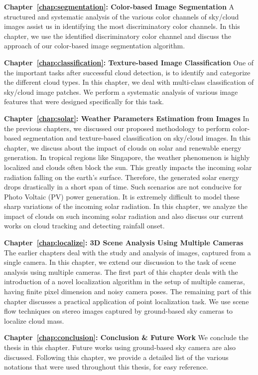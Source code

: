 \textbf{Chapter~\ref{chap:segmentation}: Color-based Image Segmentation} \tab A structured and systematic analysis of the various color channels of sky/cloud images assist us in identifying the most discriminatory color channels. In this chapter, we use the identified discriminatory color channel and discuss the approach of our color-based image segmentation algorithm. 



\textbf{Chapter~\ref{chap:classification}: Texture-based Image Classification} \tab One of the important tasks after successful cloud detection, is to identify and categorize the different cloud types. In this chapter, we deal with multi-class classification of sky/cloud image patches. We perform a systematic analysis of various image features that were designed specifically for this task. 


\textbf{Chapter~\ref{chap:solar}: Weather Parameters Estimation from Images} \tab In the previous chapters, we discussed our proposed methodology to perform color-based segmentation and texture-based classification on sky/cloud images. In this chapter, we discuss about the impact of clouds on solar and renewable energy generation. In tropical regions like Singapore, the weather phenomenon is highly localized and clouds often block the sun. This greatly impacts the incoming solar radiation falling on the earth's surface. Therefore, the generated solar energy drops drastically in a short span of time. Such scenarios are not conducive for Photo Voltaic (PV) power generation. It is extremely difficult to model these sharp variations of the incoming solar radiation. In this chapter, we analyze the impact of clouds on such incoming solar radiation and also discuss our current works on cloud tracking and detecting rainfall onset.


\textbf{Chapter~\ref{chap:localize}: 3D Scene Analysis Using Multiple Cameras} The earlier chapters deal with the study and analysis of images, captured from a single camera. In this chapter, we extend our discussion to the task of scene analysis using multiple cameras. The first part of this chapter deals with the introduction of a novel localization algorithm in the setup of multiple cameras, having finite pixel dimension and noisy camera poses. The remaining part of this chapter discusses a practical application of point localization task. We use scene flow techniques on stereo images captured by ground-based sky cameras to localize cloud mass. 


\textbf{Chapter~\ref{chap:conclusion}: Conclusion \& Future Work} \tab We conclude the thesis in this chapter. Future works using ground-based sky camera are also discussed. Following this chapter, we provide a detailed list of the various notations that were used throughout this thesis, for easy reference. 






















